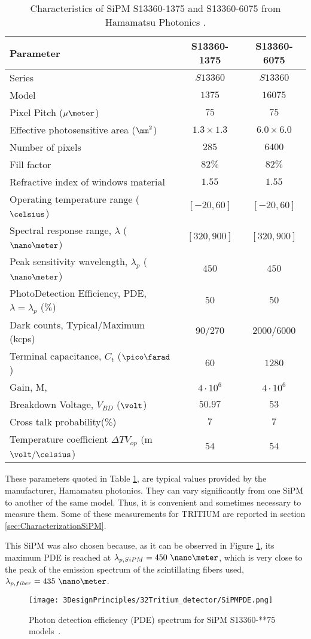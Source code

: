 \begin{table}[htbp]
\centering{}%
\begin{tabular}{lcc}
\toprule 
Parameter & S13360-1375 & S13360-6075 \tabularnewline
\midrule
\midrule 
Series & $S13360$ & $S13360$ \tabularnewline
Model & $1375$ & $16075$ \tabularnewline
Pixel Pitch ($\mu\meter$) & $75$ & $75$ \tabularnewline
Effective photosensitive area ($\mm^2$) & $1.3 \times 1.3$ & $6.0 \times 6.0$ \tabularnewline
Number of pixels & $285$ & $6400$ \tabularnewline
Fill factor & $82\%$ & $82\%$ \tabularnewline
Refractive index of windows material & $1.55$ & $1.55$ \tabularnewline
Operating temperature range ($\celsius$) & $[-20,60]$ & $[-20,60]$ \tabularnewline
Spectral response range, $\lambda$ ($\nano\meter$) & $[320, 900]$ & $[320, 900]$ \tabularnewline
Peak sensitivity wavelength, $\lambda_p$ ($\nano\meter$) & $450$ & $450$ \tabularnewline
PhotoDetection Efficiency, PDE, $\lambda=\lambda_p$ ($\%$) & $50$ & $50$ \tabularnewline
Dark counts, Typical/Maximum (kcps) & $90/270$ & $2000/6000$ \tabularnewline
Terminal capacitance, $C_t$ ($\pico\farad$) & $60$ & $1280$ \tabularnewline
Gain, M, & $4 \cdot{} 10^6$ & $4 \cdot{} 10^6$ \tabularnewline
Breakdown Voltage, $V_{BD}$ ($\volt$) & $50.97$ & $53$ \tabularnewline
Cross talk probability($\%$) & $7$ & $7$ \tabularnewline
Temperature coefficient $\Delta TV_{op}$ (m$\volt/\celsius$) & $54$ & $54$ \tabularnewline
\bottomrule
\end{tabular}
\caption{Characteristics of SiPM S13360-1375 and S13360-6075 from Hamamatsu Photonics \cite{DataSheetHammamatsu_1_SiPM_1375}.}
\label{tab:PropertiesOfSiPM1375}
\end{table}

These parameters quoted in Table \ref{tab:PropertiesOfSiPM1375}, are typical values provided by the manufacturer, Hamamatsu photonics. They can vary significantly from one SiPM to another of the same model. Thus, it is convenient and sometimes necessary to measure them. Some of these measurements for TRITIUM are reported in section \ref{sec:CharacterizationSiPM}. 

This SiPM was also chosen because, as it can be observed in Figure \ref{fig:PDESiPM}, its maximum PDE is reached at $\lambda_{p,SiPM}=450~\nano\meter$, which is very close to the peak of the emission spectrum of the scintillating fibers used, $\lambda_{p,fiber}=435~\nano\meter$.

\begin{figure}[htbp]
\centering
\texttt{[image: 3DesignPrinciples/32Tritium\_detector/SiPMPDE.png]}
\caption{Photon detection efficiency (PDE) spectrum for SiPM S13360-**75 models~\cite{DataSheetHammamatsu_1_SiPM_1375}.\label{fig:PDESiPM}}
\end{figure}


